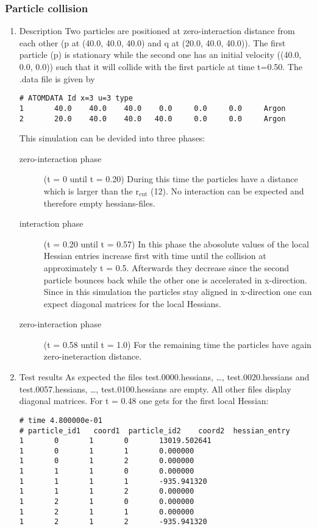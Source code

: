 \documentclass[11pt]{article}
\begin{document}
\subsubsection{Particle collision}
\label{sec-1-4-6}
\begin{enumerate}
\item Description
\label{sec-1-4-6-1}
Two particles are positioned at zero-interaction distance from each other (p at (40.0, 40.0, 40.0) and q at (20.0, 40.0, 40.0)).
The first particle (p) is stationary while the second one has an initial velocity ((40.0, 0.0, 0.0)) such that it will collide
with the first particle at time t=0.50.
The .data file is given by
\begin{verbatim}
# ATOMDATA Id x=3 u=3 type
1       40.0    40.0    40.0    0.0     0.0     0.0     Argon
2       20.0    40.0    40.0   40.0     0.0     0.0     Argon
\end{verbatim}
This simulation can be devided into three phases:
\begin{description}
\item[{zero-interaction phase}] (t = 0 until t = 0.20) During this time the particles have a distance which is larger than the r$_{\text{cut}}$ (12).
No interaction can be expected and therefore empty hessians-files.
\item[{interaction phase}] (t = 0.20 until t = 0.57) In this phase the abosolute values of the local Hessian entries increase first with time until the collision at approximately t = 0.5.
Afterwards they decrease since the second particle bounces back while the other one is accelerated in x-direction.
Since in this simulation the particles stay aligned in x-direction one can expect diagonal matrices for the local Hessians.
\item[{zero-interaction phase}] (t = 0.58 until t = 1.0) For the remaining time the particles have again zero-ineteraction distance.
\end{description}
\item Test results
\label{sec-1-4-6-2}
As expected the files test.0000.hessians, \ldots{}, test.0020.hessians and test.0057.hessians, \ldots{}, test.0100.hessians are empty.
All other files display diagonal matrices. For t = 0.48 one gets for the first local Hessian:
\begin{verbatim}
# time 4.800000e-01
# particle_id1   coord1  particle_id2    coord2  hessian_entry
1       0       1       0       13019.502641
1       0       1       1       0.000000
1       0       1       2       0.000000
1       1       1       0       0.000000
1       1       1       1       -935.941320
1       1       1       2       0.000000
1       2       1       0       0.000000
1       2       1       1       0.000000
1       2       1       2       -935.941320
\end{verbatim}
\end{enumerate}
\end{document}
